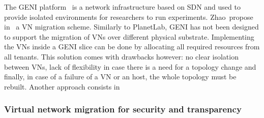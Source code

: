 The GENI platform~\cite{GENI-Berman2014} is a network infrastructure based on SDN and used to provide isolated environments for researchers to run experiments.
Zhao~\etal propose in~\cite{Zhao2017} a VN migration scheme. Similarly to PlanetLab, GENI has not been designed to support the migration of VNs over different physical substrate. Implementing the VNs inside a GENI slice can be done by allocating all required resources from all tenants. This solution comes with drawbacks however: no clear isolation between VNs, lack of flexibility in case there is a need for a topology change and finally, in case of a failure of a VN or an host, the whole topology must be rebuilt.
Another approach consists in 

\subsubsection{Virtual network migration for security and transparency}
\cite{Liu2015a,coconut-ghorbani2017,toward-Ghorbani2014,Chowdhary2016}

